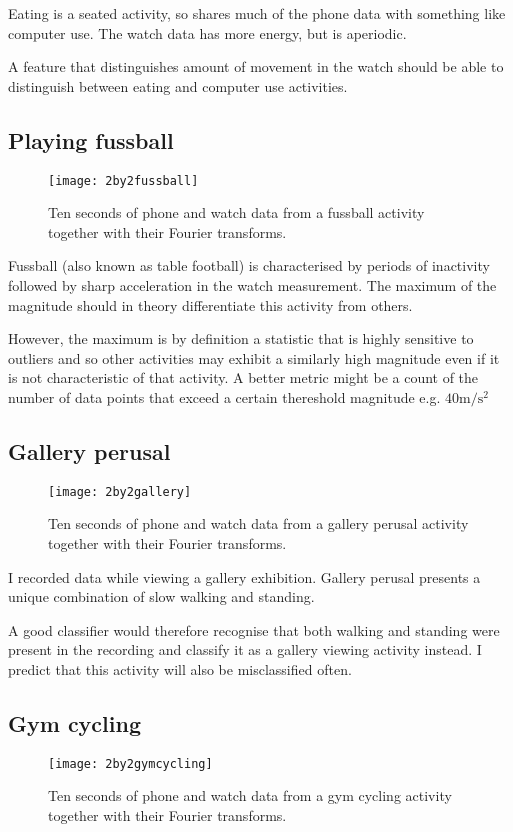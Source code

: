       Eating is a seated activity, so shares much of the phone data with something like computer use. The watch data has more energy, but is aperiodic.
      
      A feature that distinguishes amount of movement in the watch should be able to distinguish between eating and computer use activities.
    \subsection{Playing fussball}
      \begin{figure}[!th]
        \centering
        \texttt{[image: 2by2fussball]}
        \caption{Ten seconds of phone and watch data from a fussball activity together with their Fourier transforms.}
        \label{fig:2by2fussball}
      \end{figure}
      
      Fussball (also known as table football) is characterised by periods of inactivity followed by sharp acceleration in the watch measurement. The maximum of the magnitude should in theory differentiate this activity from others.
      
      However, the maximum is by definition a statistic that is highly sensitive to outliers and so other activities may exhibit a similarly high magnitude even if it is not characteristic of that activity. A better metric might be a count of the number of data points that exceed a certain thereshold magnitude e.g. $40 \si{\metre\per\square\second}$ 
    \subsection{Gallery perusal}
      \begin{figure}[!th]
        \centering
        \texttt{[image: 2by2gallery]}
        \caption{Ten seconds of phone and watch data from a gallery perusal activity together with their Fourier transforms.}
        \label{fig:2by2gallery}
      \end{figure}
      
      I recorded data while viewing a gallery exhibition. Gallery perusal presents a unique combination of slow walking and standing.
      
      A good classifier would therefore recognise that both walking and standing were present in the recording and classify it as a gallery viewing activity instead. I predict that this activity will also be misclassified often.
    \subsection{Gym cycling}
      \begin{figure}[!th]
        \centering
        \texttt{[image: 2by2gymcycling]}
        \caption{Ten seconds of phone and watch data from a gym cycling activity together with their Fourier transforms.}
        \label{fig:2by2gymcycling}
      \end{figure}
      
